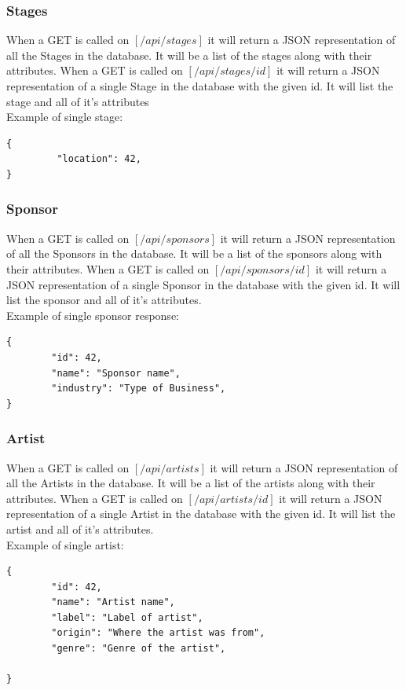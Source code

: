 \documentclass[12pt,english]{scrartcl}
\begin{document}
\subsubsection{Stages}

When a GET is called on $[/api/stages]$ it will return a JSON representation of all the Stages in the database.  It will be a list of the stages along with their attributes.
When a GET is called on $[/api/stages/{id}]$ it will return a JSON representation of a single Stage in the database with the given id.  It will list the stage and all of it's attributes
\\
Example of single stage:
\begin{verbatim}
{
         "location": 42,
}
\end{verbatim}
\subsubsection{Sponsor}

When a GET is called on $[/api/sponsors]$ it will return a JSON representation of all the Sponsors in the database.  It will be a list of the sponsors along with their attributes.
When a GET is called on $[/api/sponsors/{id}]$ it will return a JSON representation of a single Sponsor in the database with the given id.  It will list the sponsor and all of it's attributes.
\\
Example of single sponsor response:
\begin{verbatim}
{
        "id": 42,
        "name": "Sponsor name",
        "industry": "Type of Business",
}
\end{verbatim}

\subsubsection{Artist}

When a GET is called on $[/api/artists]$ it will return a JSON representation of all the Artists in the database.  It will be a list of the artists along with their attributes.
When a GET is called on $[/api/artists/{id}]$ it will return a JSON representation of a single Artist in the database with the given id.  It will list the artist and all of it's attributes.
\\
Example of single artist:
\begin{verbatim}
{
        "id": 42,
        "name": "Artist name",
        "label": "Label of artist",
        "origin": "Where the artist was from",
        "genre": "Genre of the artist",
        
}
\end{verbatim}
\end{document}
